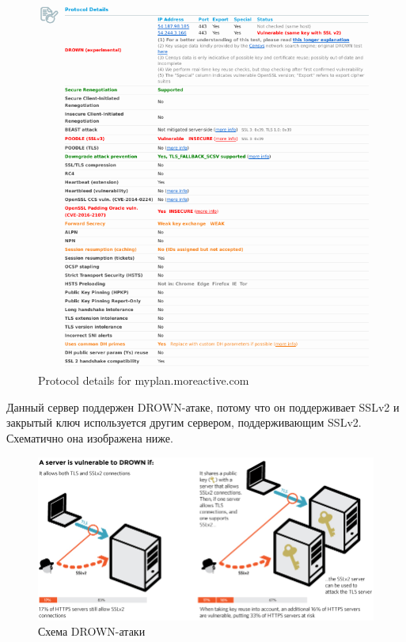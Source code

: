 \documentclass[a4paper]{article}
\begin{document}
\begin{figure}[H]
	\begin{center}
		\includegraphics[scale=0.7]{pics/moreactive.com_protocol_details.png}
		\caption{Protocol details for myplan.moreactive.com} 
		\label{pic:pic_name}
	\end{center}
\end{figure}

Данный сервер поддержен DROWN-атаке, потому что он поддерживает SSLv2 и закрытый ключ используется другим сервером, поддерживающим SSLv2. Схематично она изображена ниже.

\begin{figure}[H]
	\begin{center}
		\includegraphics[scale=0.4]{pics/drown_diag.jpg}
		\caption{Схема DROWN-атаки} 
		\label{pic:pic_name}
	\end{center}
\end{figure}
\end{document}
